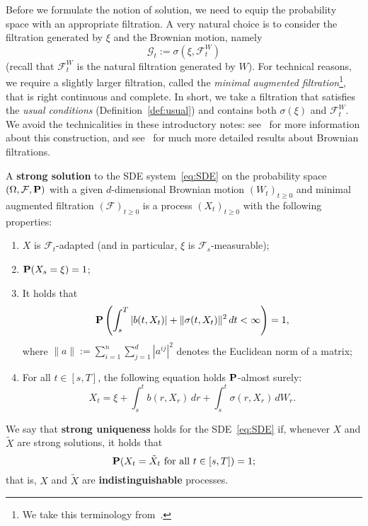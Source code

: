 Before we formulate the notion of solution, we need to equip the probability space with an appropriate filtration. A very natural choice is to consider the filtration generated by $\xi$ and the Brownian motion, namely
\begin{equation*}
	\mathcal{G}_t := \sigma(\xi, \mathcal{F}^W_t)
\end{equation*}
(recall that $\mathcal{F}^W_t$ is the natural filtration generated by $W$). For technical reasons, we require a slightly larger filtration, called the \emph{minimal augmented filtration}\footnote{We take this terminology from~\cite{Bass2}.}, that is right continuous and complete. In short, we take a filtration that satisfies the \emph{usual conditions} (Definition~\ref{def:usual}) and contains both $\sigma(\xi)$ and $\mathcal{F}^W_t$. We avoid the technicalities in these introductory notes: see~\cite[p.\ 2]{Bass2} for more information about this construction, and see~\cite[Section 2.7]{KS} for much more detailed results about Brownian filtrations.

\begin{definition}
	A \textbf{strong solution} to the SDE system~\eqref{eq:SDE} on the probability space $(\Omega,\mathcal{F},\mathbf{P})$ with a given $d$-dimensional Brownian motion $(W_t)_{t\ge 0}$ and minimal augmented filtration $(\mathcal{F})_{t\ge 0}$ is a process $(X_t)_{t\ge 0}$ with the following properties:
	\begin{enumerate}[\upshape (i)]
		\item $X$ is $\mathcal{F}_t$-adapted (and in particular, $\xi$ is $\mathcal{F}_s$-measurable);
		\item $\mathbf{P}(X_s=\xi)=1$;
		\item It holds that
		\begin{equation*}
			\mathbf{P}\left(\int_s^T |b(t,X_t)| + \|\sigma(t,X_t)\|^2\,dt <\infty\right) = 1,
		\end{equation*}
		where $\|a\| := \sum_{i=1}^n\sum_{j=1}^d |a^{ij}|^2$ denotes the Euclidean norm of a matrix;
		\item For all $t\in [s,T]$, the following equation holds $\mathbf{P}$-almost surely:
		\begin{equation*}
			X_t = \xi + \int_s^t b(r,X_r)\,dr + \int_s^t \sigma(r,X_r)\,dW_r.
		\end{equation*}
	\end{enumerate}
	
	We say that \textbf{strong uniqueness} holds for the SDE~\eqref{eq:SDE} if, whenever $X$ and $\tilde{X}$ are strong solutions, it holds that
	\begin{equation*}
		\mathbf{P}(X_t=\tilde{X}_t \text{ for all }t\in [s,T]) = 1;
	\end{equation*}
	that is, $X$ and $\tilde{X}$ are \textbf{indistinguishable} processes.
\end{definition}

